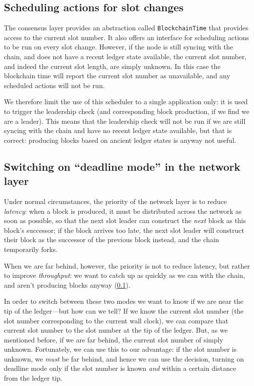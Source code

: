 \subsection{Scheduling actions for slot changes}
\label{time:scheduling-actions}

The consensus layer provides an abstraction called \lstinline!BlockchainTime!
that provides access to the current slot number. It also offers an interface
for scheduling actions to be run on every slot change. However, if the node
is still syncing with the chain, and does not have a recent ledger state
available, the current slot number, and indeed the current slot length,
are simply unknown. In this case the blockchain time will report the current
slot number as unavailable, and any scheduled actions will not be run.

We therefore limit the use of this scheduler to a single application only:
it is used to trigger the leadership check (and corresponding block
production, if we find we are a leader). This means that the leadership
check will not be run if we are still syncing with the chain and have no
recent ledger state available, but that is correct: producing blocks based on
ancient ledger states is anyway not useful.

\subsection{Switching on ``deadline mode'' in the network layer}

Under normal circumstances, the priority of the network layer is to reduce
\emph{latency}: when a block is produced, it must be distributed across the
network as soon as possible, so that the next slot leader can construct the
\emph{next} block as this block's successor; if the block arrives too late,
the next slot leader will construct their block as the successor of the previous
block instead, and the chain temporarily forks.

When we are far behind, however, the priority is not to reduce latency, but
rather to improve \emph{throughput}: we want to catch up as quickly as we can
with the chain, and aren't producing blocks anyway
(\cref{time:scheduling-actions}).

In order to switch between these two modes we want to know if we are near the
tip of the ledger---but how can we tell? If we know the current slot number
(the slot number corresponding to the current wall clock), we can compare
that current slot number to the slot number at the tip of the ledger. But,
as we mentioned before, if we are far behind, the current slot number of
simply unknown. Fortunately, we can use this to our advantage: if the
slot number is unknown, we \emph{must} be far behind, and hence we can use
the decision, turning on deadline mode only if the slot number is known
\emph{and} within a certain distance from the ledger tip.
